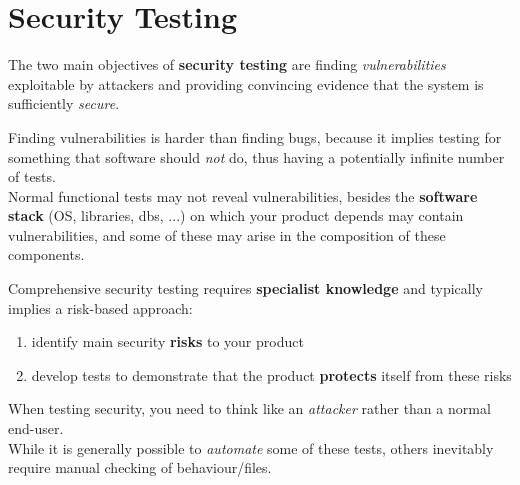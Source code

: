 
\section{Security Testing}
The two main objectives of \textbf{security testing} are finding \textit{vulnerabilities} exploitable by attackers and providing convincing evidence that the system is sufficiently \textit{secure}.

Finding vulnerabilities is harder than finding bugs, because it implies testing for something that software should \textit{not} do,
thus having a potentially infinite
number of tests.\\
Normal functional tests may not reveal vulnerabilities, besides
the \textbf{software stack} (OS, libraries, dbs, ...) on which your product depends may contain vulnerabilities,
and some of these may arise in the composition of these components.


Comprehensive security testing requires
\textbf{specialist knowledge} and typically implies a risk-based approach:
\begin{enumerate}
   \item identify main security \textbf{risks} to your
   product
   \item develop tests to demonstrate that the
   product \textbf{protects} itself from these risks
\end{enumerate}
When testing security, you need to think like an \textit{attacker} rather than a normal end-user.\\
While it is generally possible to \textit{automate} some of these tests,
others inevitably require manual checking
of behaviour/files.

